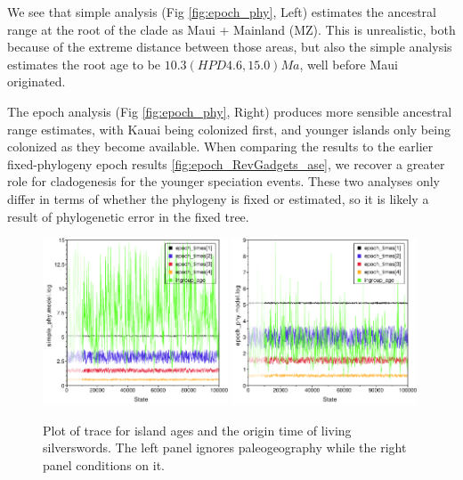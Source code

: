 We see that simple analysis (Fig \ref{fig:epoch_phy}, Left) estimates the ancestral range at the root of the clade as Maui + Mainland (MZ).
This is unrealistic, both because of the extreme distance between those areas, but also the simple analysis estimates the root age to be $10.3 (HPD 4.6, 15.0) Ma$, well before Maui originated.

The epoch analysis (Fig \ref{fig:epoch_phy}, Right) produces more sensible ancestral range estimates, with Kauai being colonized first, and younger islands only being colonized as they become available.
When comparing the results to the earlier fixed-phylogeny epoch results \ref{fig:epoch_RevGadgets_ase}, we recover a greater role for cladogenesis for the younger speciation events.
These two analyses only differ in terms of whether the phylogeny is fixed or estimated, so it is likely a result of phylogenetic error in the fixed tree.

\begin{figure}[!ht]
\centering
\includegraphics[width=0.49\textwidth]{figures/fig_simple_ages.pdf} \includegraphics[width=0.49\textwidth]{figures/fig_epoch_ages.pdf} 

\caption{Plot of trace for island ages and the origin time of living silverswords. The left panel ignores paleogeography while the right panel conditions on it.}
\label{fig:epoch_ages}
\end{figure}

